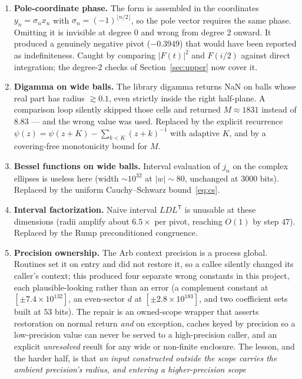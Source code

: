 \documentclass[11pt,a4paper]{article}
\theoremstyle{definition}
\theoremstyle{remark}
\begin{document}
\begin{enumerate}
\item \textbf{Pole-coordinate phase.} The form is assembled in the coordinates
  $y_n = \sigma_n x_n$ with $\sigma_n = (-1)^{\lfloor n/2\rfloor}$, so the pole
  vector requires the same phase. Omitting it is invisible at degree $0$ and
  wrong from degree $2$ onward. It produced a genuinely negative pivot
  ($-0.3949$) that would have been reported as indefiniteness. Caught by
  comparing $|F(t)|^2$ and $F(i/2)$ against direct integration; the degree-$2$
  checks of Section~\ref{sec:upper} now cover it.
\item \textbf{Digamma on wide balls.} The library digamma returns NaN on balls
  whose real part has radius $\gtrsim 0.1$, even strictly inside the right
  half-plane. A comparison loop silently skipped those cells and returned
  $M \approx 1831$ instead of $8.83$ --- and the wrong value was used. Replaced
  by the explicit recurrence $\psi(z) = \psi(z+K) - \sum_{k<K}(z+k)^{-1}$ with
  adaptive $K$, and by a covering-free monotonicity bound for $M$.
\item \textbf{Bessel functions on wide balls.} Interval evaluation of $j_n$ on
  the complex ellipses is useless here (width $\sim10^{32}$ at $|w|\sim80$,
  unchanged at $3000$ bits). Replaced by the uniform
  Cauchy--Schwarz bound~\eqref{eq:cs}.
\item \textbf{Interval factorization.} Naive interval $LDL^{\mathsf T}$ is
  unusable at these dimensions (radii amplify about $6.5\times$ per pivot,
  reaching $O(1)$ by step $47$). Replaced by the Rump preconditioned congruence.
\item \textbf{Precision ownership.} The Arb context precision is a process
  global. Routines set it on entry and did not restore it, so a callee silently
  changed its caller's context; this produced four separate wrong constants in
  this project, each plausible-looking rather than an error (a complement
  constant at $[\pm 7.4\times10^{132}]$, an even-sector $d$ at $[\pm
  2.8\times10^{183}]$, and two coefficient sets built at $53$ bits). The repair
  is an owned-scope wrapper that asserts restoration on normal return
  \emph{and} on exception, caches keyed by precision so a low-precision value
  can never be served to a high-precision caller, and an explicit
  \emph{unresolved} result for any wide or non-finite enclosure. The lesson, and
  the harder half, is that \emph{an input constructed outside the scope carries
  the ambient precision's radius, and entering a higher-precision scope
}
\end{enumerate}
\end{document}
